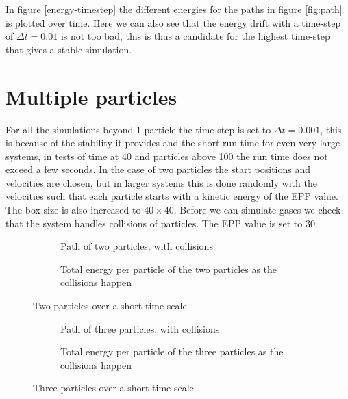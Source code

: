 \documentclass[10pt,a4paper,aps,twocolumn,secnumarabic,numerical,balancelastpage,nofootinbib,superscriptaddress]{revtex4-2}
\begin{document}
	In figure \ref{energy-timestep} the different energies for the paths in figure \ref{fig:path} is plotted over time. Here we can also see that the energy drift with a time-step of $\Delta t = 0.01$ is not too bad, this is thus a candidate for the highest time-step that gives a stable simulation.
	
	
	\section{Multiple particles}
	
		For all the simulations beyond 1 particle the time step is set to $\Delta t =0.001$, this is because of the stability it provides and the short run time for even very large systems, in tests of time at 40 and particles above 100 the run time does not exceed a few seconds. In the case of two particles the start positions and velocities are chosen, but in larger systems this is done randomly with the velocities such that each particle starts with a kinetic energy of the EPP value. The box size is also increased to $40\times40$. Before we can simulate gases we check that the system handles collisions of particles. The EPP value is set to 30.
		\begin{figure*}[htb]
			\centering
			\begin{subfigure}{.45\textwidth}
				\hspace*{-2cm}\scalebox{0.8}{}
				\caption{Path of two particles, with collisions}
			\end{subfigure}
			\begin{subfigure}{.45\textwidth}
				\scalebox{0.6}{}
				\caption{Total energy per particle of the two particles as the collisions happen}
			\end{subfigure}
			\caption{\label{two-collide}Two particles over a short time scale}
		\end{figure*}
		
		\begin{figure*}[htb]
			\centering
			\begin{subfigure}{.45\textwidth}
				\hspace*{-2cm}\scalebox{0.8}{}
				\caption{Path of three particles, with collisions}
			\end{subfigure}
			\begin{subfigure}{.45\textwidth}
				\scalebox{0.6}{}
				\caption{Total energy per particle of the three particles as the collisions happen}
			\end{subfigure}
			\caption{\label{three-collide}Three particles over a short time scale}
		\end{figure*}
		
\end{document}

